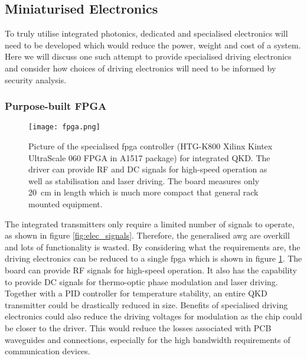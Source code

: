 


\subsection{Miniaturised Electronics}

To truly utilise integrated photonics, dedicated and specialised electronics will need to be developed which would reduce the power, weight and cost of a system. Here we will discuss one such attempt to provide specialised driving electronics and consider how choices of driving electronics will need to be informed by security analysis.

\subsubsection{Purpose-built FPGA}

\begin{figure}[t]
	\centering
	\texttt{[image: fpga.png]}
	\caption[Picture of the specialised FPGA controller for integrated QKD]{Picture of the specialised \ac{fpga} controller (HTG-K800 Xilinx Kintex UltraScale 060 FPGA in A1517 package) for integrated QKD. The driver can provide RF and DC signals for high-speed operation as well as stabilisation and laser driving. The board measures only \SI{20}{\cm} in length which is much more compact that general rack mounted equipment.}
	\label{fig:fpga}
\end{figure}

The integrated transmitters only require a limited number of signals to operate, as shown in figure \ref{fig:elec_signals}. Therefore, the generalised \ac{awg} are overkill and lots of functionality is wasted. By considering what the requirements are, the driving electronics can be reduced to a single \ac{fpga} which is shown in figure \ref{fig:fpga}. The board can provide RF signals for high-speed operation. It also has the capability to provide DC signals for thermo-optic phase modulation and laser driving. Together with a PID controller for temperature stability, an entire \ac{QKD} transmitter could be drastically reduced in size. Benefits of specialised driving electronics could also reduce the driving voltages for modulation as the chip could be closer to the driver. This would reduce the losses associated with PCB waveguides and connections, especially for the high bandwidth requirements of communication devices. 

